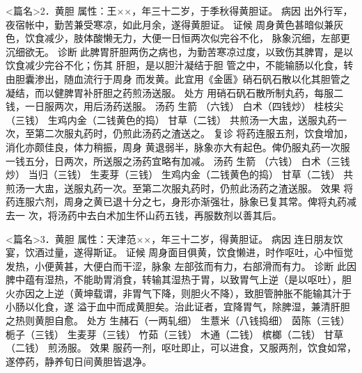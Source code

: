 \documentclass[a4paper,12pt,UTF8,twoside]{ctexbook}
\begin{document}
<篇名>2．黄胆
属性：王××，年三十二岁，于季秋得黄胆证。 
病因 出外行军，夜宿帐中，勤苦兼受寒凉，如此月余，遂得黄胆证。 
证候 周身黄色甚暗似兼灰色，饮食减少，肢体酸懒无力，大便一日恒两次似完谷不化， 
脉象沉细，左部更沉细欲无。 
诊断 此脾胃肝胆两伤之病也，为勤苦寒凉过度，以致伤其脾胃，是以饮食减少完谷不化；伤其 
肝胆，是以胆汁凝结于胆 
管之中，不能输肠以化食，转由胆囊渗出，随血流行于周身 
而发黄。此宜用《金匮》硝石矾石散以化其胆管之凝结，而以健脾胃补肝胆之药煎汤送服。 
处方 用硝石矾石散所制丸药，每服二钱，一日服两次，用后汤药送服。 
汤药 生箭 （六钱） 白术（四钱炒） 桂枝尖（三钱） 生鸡内金（二钱黄色的捣） 甘草（二钱） 
共煎汤一大盅，送服丸药一次，至第二次服丸药时，仍煎此汤药之渣送之。 
复诊 将药连服五剂，饮食增加，消化亦颇佳良，体力稍振，周身 
黄退弱半，脉象亦大有起色。俾仍服丸药一次服一钱五分，日两次，所送服之汤药宜略有加减。 
汤药 生箭 （六钱） 白术（三钱炒） 当归（三钱） 生麦芽（三钱） 
生鸡内金（二钱黄色的捣） 甘草（二钱） 
共煎汤一大盅，送服丸药一次。至第二次服丸药时，仍煎此汤药之渣送服。 
效果 将药连服六剂，周身之黄已退十分之七，身形亦渐强壮，脉象已复其常。俾将丸药减去一 
次，将汤药中去白术加生怀山药五钱，再服数剂以善其后。 

<篇名>3．黄胆
属性：天津范××，年三十二岁，得黄胆证。 
病因 连日朋友饮宴，饮酒过量，遂得斯证。 
证候 周身面目俱黄，饮食懒进，时作呕吐，心中恒觉发热，小便黄甚，大便白而干涩，脉象 
左部弦而有力，右部滑而有力。 
诊断 此因脾中蕴有湿热，不能助胃消食，转输其湿热于胃，以致胃气上逆（是以呕吐），胆 
火亦因之上逆（黄坤载谓，非胃气下降，则胆火不降），致胆管肿胀不能输其汁于小肠以化食，遂 
溢于血中而成黄胆矣。治此证者，宜降胃气，除脾湿，兼清肝胆之热则黄胆自愈。 
处方 生赭石（一两轧细） 生薏米（八钱捣细） 茵陈（三钱） 栀子（三钱） 
生麦芽（三钱） 竹茹（三钱） 木通（二钱） 槟榔（二钱） 甘草（二钱） 
煎汤服。 
效果 服药一剂，呕吐即止，可以进食，又服两剂，饮食如常，遂停药，静养旬日间黄胆皆退净。 
\end{document}
